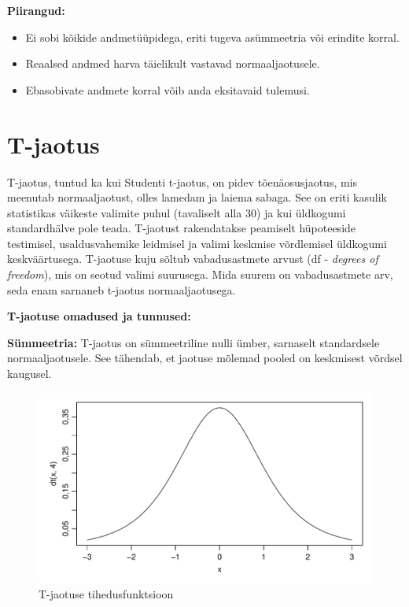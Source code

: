 \documentclass[
]{book}
\providecommand{\tightlist}{%
  \setlength{\itemsep}{0pt}\setlength{\parskip}{0pt}}
\begin{document}
\textbf{Piirangud:}

\begin{itemize}
\tightlist
\item
  Ei sobi kõikide andmetüüpidega, eriti tugeva asümmeetria või erindite korral.
\item
  Reaalsed andmed harva täielikult vastavad normaaljaotusele.
\item
  Ebasobivate andmete korral võib anda eksitavaid tulemusi.
\end{itemize}

\section{T-jaotus}\label{t-jaotus}

T-jaotus, tuntud ka kui Studenti t-jaotus, on pidev tõenäosusjaotus, mis meenutab normaaljaotust, olles lamedam ja laiema sabaga. See on eriti kasulik statistikas väikeste valimite puhul (tavaliselt alla 30) ja kui üldkogumi standardhälve pole teada. T-jaotust rakendatakse peamiselt hüpoteeside testimisel, usaldusvahemike leidmisel ja valimi keskmise võrdlemisel üldkogumi keskväärtusega. T-jaotuse kuju sõltub vabadusastmete arvust (df - \emph{degrees of freedom}), mis on seotud valimi suurusega. Mida suurem on vabadusastmete arv, seda enam sarnaneb t-jaotus normaaljaotusega.

\textbf{T-jaotuse omadused ja tunnused:}

\textbf{Sümmeetria:} T-jaotus on sümmeetriline nulli ümber, sarnaselt standardsele normaaljaotusele. See tähendab, et jaotuse mõlemad pooled on keskmisest võrdsel kaugusel.

\begin{figure}[H]
\includegraphics[width=0.8\linewidth]{_main_files/figure-latex/unnamed-chunk-37-1} \caption{T-jaotuse tihedusfunktsioon}\label{fig:unnamed-chunk-37}
\end{figure}
\end{document}

